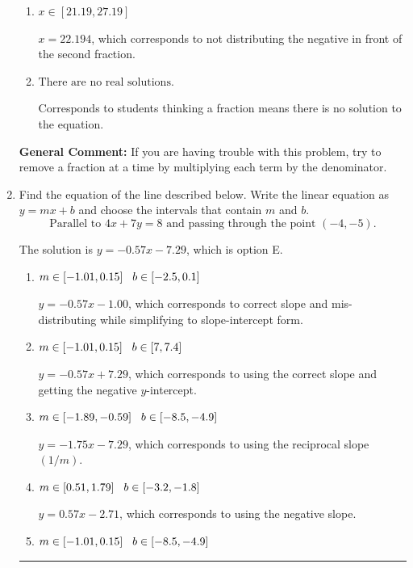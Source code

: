 \documentclass{extbook}[14pt]
\newcommand{\litem}[1]{\item #1

\rule{\textwidth}{0.4pt}}
\begin{document}
\begin{enumerate}
{\begin{enumerate}[label=\Alph*.]
 $x = 1.676$, which corresponds to dividing the second number in the numerator by the denominator rather than dividing BOTH parts of the numerator by the denominator (or removing the fractions through multiplication).
\item \( x \in [21.19, 27.19] \)

 $x = 22.194$, which corresponds to not distributing the negative in front of the second fraction.
\item \( \text{There are no real solutions.} \)

Corresponds to students thinking a fraction means there is no solution to the equation.
\end{enumerate}

\textbf{General Comment:} If you are having trouble with this problem, try to remove a fraction at a time by multiplying each term by the denominator.
}
\litem{
Find the equation of the line described below. Write the linear equation as $ y=mx+b $ and choose the intervals that contain $m$ and $b$.
\[ \text{Parallel to } 4 x + 7 y = 8 \text{ and passing through the point } (-4, -5). \]

The solution is \( y = -0.57x - 7.29 \), which is option E.\begin{enumerate}[label=\Alph*.]
\item \( m \in [-1.01, 0.15] \hspace*{3mm} b \in [-2.5, 0.1] \)

 $y = -0.57x - 1.00$, which corresponds to correct slope and mis-distributing while simplifying to slope-intercept form.
\item \( m \in [-1.01, 0.15] \hspace*{3mm} b \in [7, 7.4] \)

 $y = -0.57x + 7.29$, which corresponds to using the correct slope and getting the negative $y$-intercept.
\item \( m \in [-1.89, -0.59] \hspace*{3mm} b \in [-8.5, -4.9] \)

 $y = -1.75x - 7.29$, which corresponds to using the reciprocal slope $(1/m)$.
\item \( m \in [0.51, 1.79] \hspace*{3mm} b \in [-3.2, -1.8] \)

 $y = 0.57x - 2.71$, which corresponds to using the negative slope.
\item \( m \in [-1.01, 0.15] \hspace*{3mm} b \in [-8.5, -4.9] \)


\end{enumerate}}
\end{enumerate}
\end{document}
